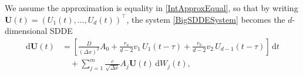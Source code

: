 \documentclass[onefignum]{siamart250211}
\begin{document}
\begin{example}
We assume the approximation is equality in \cref{IntApproxEqual}, so that by writing $\bm{U}(t)=(U_1(t),\ldots,U_d(t))^\intercal$, the system \cref{BigSDDESystem} becomes the $d$-dimensional SDDE
\begin{align}
\mathrm{d}\bm{U}(t)&=\left[\frac{D}{(\Delta x)^2}A_0+\frac{r_a}{d-2}v_1\,U_1(t-\tau)+\frac{r_b}{d-2}v_2\,U_{d-1}(t-\tau)\right]\,\mathrm{d}t\label{BigMatrixSDDE}\\
&\quad+\sum_{j=1}^m\frac{c}{\sqrt{\Delta x}}A_j\bm{U}(t)\,\mathrm{d}W_j(t),\nonumber

\end{align}
\end{example}
\end{document}

